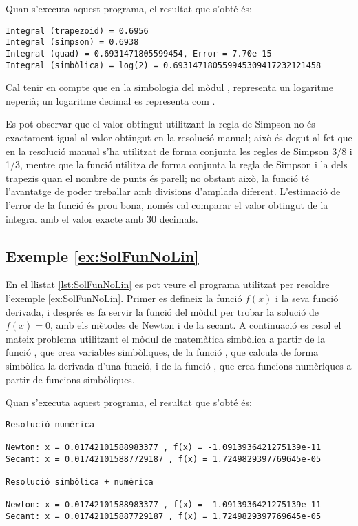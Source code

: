 Quan s'executa aquest programa, el resultat que s'obté és:
\lstset{
	language=,
	numbers=none,
	frame=none
}
\begin{lstlisting}
Integral (trapezoid) = 0.6956
Integral (simpson) = 0.6938
Integral (quad) = 0.6931471805599454, Error = 7.70e-15
Integral (simbòlica) = log(2) = 0.693147180559945309417232121458
\end{lstlisting} 

Cal tenir en compte que en la simbologia del mòdul ,  representa un logaritme neperià; un logaritme decimal es representa com .

Es pot observar que el valor obtingut utilitzant la regla de Simpson no és exactament igual al valor obtingut en la resolució manual; això és degut al fet que en la resolució manual s'ha utilitzat de forma conjunta les regles de Simpson 3/8 i 1/3, mentre que la funció   utilitza de forma conjunta la regla de Simpson i la dels trapezis quan el nombre de punts és parell; no obstant això, la funció  té l'avantatge de poder treballar amb divisions d'amplada diferent. L'estimació de l'error de la funció  és prou bona, només cal comparar el valor obtingut de la integral  amb el valor exacte amb 30 decimals.


\hypertarget{exemple:SolFunNoLin}{\subsection{Exemple \ref*{ex:SolFunNoLin} \SolFunNoLin}}
En el llistat \vref{lst:SolFunNoLin} es pot veure el programa utilitzat per resoldre l'exemple \vref{ex:SolFunNoLin}. Primer es defineix la funció $f(x)$ i la seva funció derivada, i després es fa servir la funció   del mòdul  per trobar la solució de $f(x)=0$, amb els mètodes de Newton i de la secant. A continuació es resol el mateix problema utilitzant el mòdul  de matemàtica simbòlica  a partir de la funció , que crea variables simbòliques, de la funció , que calcula de forma simbòlica la derivada d'una funció, i de la funció  , que crea funcions numèriques a partir de funcions simbòliques.


Quan s'executa aquest programa, el resultat que s'obté és:
\lstset{
	language=,
	numbers=none,
	frame=none
}
\begin{lstlisting}
Resolució numèrica
----------------------------------------------------------------
Newton: x = 0.01742101588983377 , f(x) = -1.0913936421275139e-11
Secant: x = 0.017421015887729187 , f(x) = 1.7249829397769645e-05

Resolució simbòlica + numèrica
----------------------------------------------------------------
Newton: x = 0.01742101588983377 , f(x) = -1.0913936421275139e-11
Secant: x = 0.017421015887729187 , f(x) = 1.7249829397769645e-05
\end{lstlisting} 
